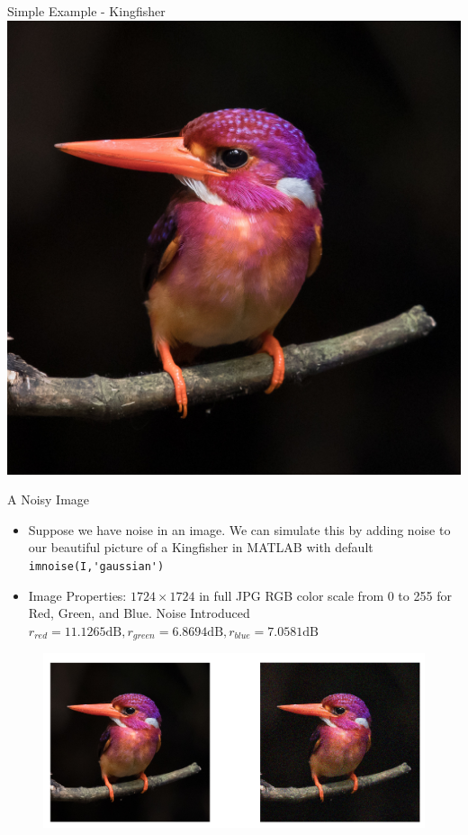 \documentclass[aspectratio=169,xcolor=dvipsnames]{beamer}
\begin{document}
	\begin{frame}{Simple Example - Kingfisher}
		\centering
		\includegraphics[scale=0.5]{Kingfisher.jpg}
	\end{frame}


	\begin{frame}[fragile]{A Noisy Image}
		\begin{itemize}
			\item Suppose we have noise in an image. We can simulate this by adding noise to our beautiful picture of a Kingfisher in MATLAB with default \verb*|imnoise(I,'gaussian')|	
			\item Image Properties: $1724\times1724$ in full JPG RGB color scale from 0 to 255 for Red, Green, and Blue. Noise Introduced $r_{red} = 11.1265 \text{dB}, r_{green} = 6.8694 \text{dB}, r_{blue} = 7.0581 \text{dB}$
		\end{itemize}
		\begin{figure}
			\centering
			\includegraphics[scale=0.35]{KingfisherWNoise.png}
		\end{figure}
	\end{frame}
	
\end{document}
